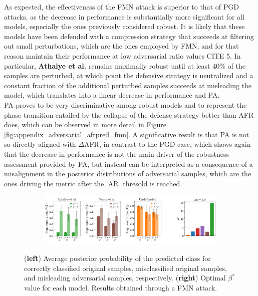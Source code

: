 As expected, the effectiveness of the FMN attack is superior to that of PGD attacks, as
the decrease in performance is substantially more significant for all models, especially the ones
previously considered robust. It is likely that these models have been defended with a
compression strategy that succeeds at filtering out small perturbations, which are
the ones employed by FMN, and for that reason maintain their performance at low
adversarial ratio values CITE 5.
In particular, {\color{tab:green} \textbf{Athalye et al.}} remains maximally robust
until at least 40\% of the samples are perturbed, at which point the defensive strategy
is neutralized and a constant fraction of the additional perturbed samples succeeds at
misleading the model, which translates into a linear decrease in performance and PA. \\

PA proves to be very discriminative among robust models and to represent the 
phase transition entailed by the collapse of the defense strategy better than AFR does, which can be
observed in more detail in Figure \ref{fig:appendix_adversarial_afrpred_fmn}. A significative
result is that PA is not so directly aligned with $\Delta$AFR, in contrast to
the PGD case, which shows again that the decrease in performance is not the main driver of
the robustness assessment provided by PA, but instead can be interpreted as a consequence of
a misalignment in the posterior distributions of adversarial samples, which are the ones driving
the metric after the $\operatorname{AR}$ thresold is reached. \\

\begin{figure}[H]
    \centering
    \begin{subfigure}[b]{\textwidth}
        \centering
        \includegraphics[width=\textwidth]{img/results_discussion/adversarial/bpda_wang_undefended_beta_fmn.png}
    \end{subfigure}
   
    \caption{(\textbf{left}) Average posterior probability of the predicted class for 
    correctly classified original samples, misclassified original samples, and 
    misleading adversarial samples, respectively. (\textbf{right}) Optimal $\beta^{*}$ value for each model.
    Results obtained through a FMN attack.}
    \label{fig:unrobust_posterior_short_fmn}
\end{figure}

